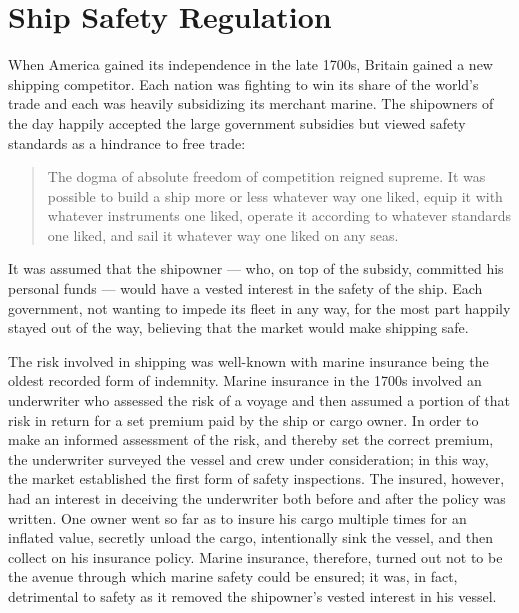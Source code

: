 \documentclass[twoside,symmetric,notoc]{tufte-book}
\begin{document}
\chapter{Ship Safety Regulation}
\label{ch:regulation}
\par{%
When America gained its independence in the late 1700s, Britain gained a new shipping competitor. Each nation was fighting to win its share of the world's trade and each was heavily subsidizing its merchant marine.\cite{Gibson} The shipowners of the day happily accepted the large government subsidies but viewed safety standards as a hindrance to free trade: 
\begin{quotation}
The dogma of absolute freedom of competition reigned supreme. It was possible to build a ship more or less whatever way one liked, equip it with whatever instruments one liked, operate it according to whatever standards one liked, and sail it whatever way one liked on any seas.\cite{Boisson}
\end{quotation} It was assumed that the shipowner --- who, on top of the subsidy, committed his personal funds --- would have a vested interest in the safety of the ship. Each government, not wanting to impede its fleet in any way, for the most part happily stayed out of the way, believing that the market would make shipping safe. 
}
\par{%
The risk involved in shipping was well-known with marine insurance being the oldest recorded form of indemnity.\cite{Noussia} Marine insurance in the 1700s involved an underwriter who assessed the risk of a voyage and then assumed a portion of that risk in return for a set premium paid by the ship or cargo owner. In order to make an informed assessment of the risk, and thereby set the correct premium, the underwriter surveyed the vessel and crew under consideration; in this way, the market established the first form of safety inspections.\cite{Bennet} The insured, however, had an interest in deceiving the underwriter both before and after the policy was written. One owner went so far as to insure his cargo multiple times for an inflated value, secretly unload the cargo, intentionally sink the vessel, and then collect on his insurance policy.\cite{Kingston} Marine insurance, therefore, turned out not to be the avenue through which marine safety could be ensured; it was, in fact, detrimental to safety as it removed the shipowner's vested interest in his vessel. 
}
\end{document}
